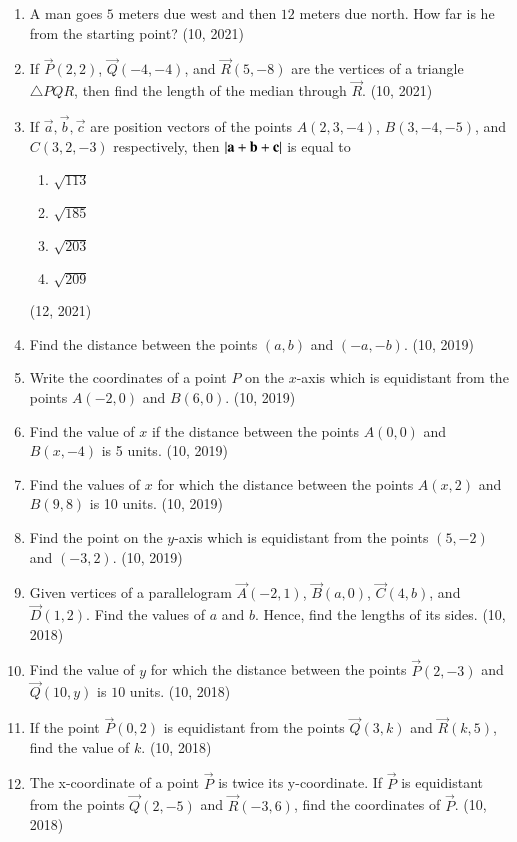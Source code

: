 \begin{enumerate}[label=\thesubsection.\arabic*, ref=\thesubsection.\theenumi]
	\item A man goes $5$ meters due west and then $12$ meters due north. How far is he from the starting point? \hfill (10, 2021)
		\item If $\vec{P}(2, 2)$, $\vec{Q}(-4, -4)$, and $\vec{R}(5, -8)$ are the vertices of a triangle $\triangle PQR$, then find the length of the median through $\vec{R}$. \hfill (10, 2021)
	\item If $\vec{a}, \vec{b}, \vec{c}$ are position vectors of the points $A(2, 3, -4)$, $B(3, -4, -5)$, and $C(3, 2, -3)$ respectively, then $\left\vert\mathbf{a}+\mathbf{b}+\mathbf{c}\right\vert$ is equal to
		\begin{enumerate}
			\item $\sqrt{113}$
			\item $\sqrt{185}$
			\item $\sqrt{203}$
			\item $\sqrt{209}$
		\end{enumerate}
	\hfill (12, 2021)
\item Find the distance between the points $(a, b)$ and $(-a, -b)$. \hfill (10, 2019)
\item Write the coordinates of a point $P$ on the $x$-axis which is equidistant from the points $A(-2, 0)$ and $B(6, 0)$. \hfill (10, 2019)
\item Find the value of $x$ if the distance between the points $A(0, 0)$ and $B(x, -4)$ is 5 units. \hfill (10, 2019)
\item Find the values of $x$ for which the distance between the points $A(x, 2)$ and $B(9, 8)$ is 10 units. \hfill (10, 2019)
\item Find the point on the $y$-axis which is equidistant from the points $(5, -2)$ and $(-3, 2)$. \hfill (10, 2019)
    \item Given vertices of a parallelogram $\vec{A}(-2,1)$, $\vec{B}(a,0)$, $\vec{C}(4,b)$, and $\vec{D}(1,2)$. Find the values of $a$ and $b$. Hence, find the lengths of its sides. \hfill (10, 2018)
    \item Find the value of $y$ for which the distance between the points $\vec{P}(2,-3)$ and $\vec{Q}(10,y)$ is $10$ units. \hfill (10, 2018)
    \item If the point $\vec{P}(0,2)$ is equidistant from the points $\vec{Q}(3,k)$ and $\vec{R}(k,5)$, find the value of $k$. \hfill (10, 2018)
    \item The x-coordinate of a point $\vec{P}$ is twice its y-coordinate. If $\vec{P}$ is equidistant from the points $\vec{Q}(2,-5)$ and $\vec{R}(-3,6)$, find the coordinates of $\vec{P}$. \hfill (10, 2018)

\end{enumerate}
